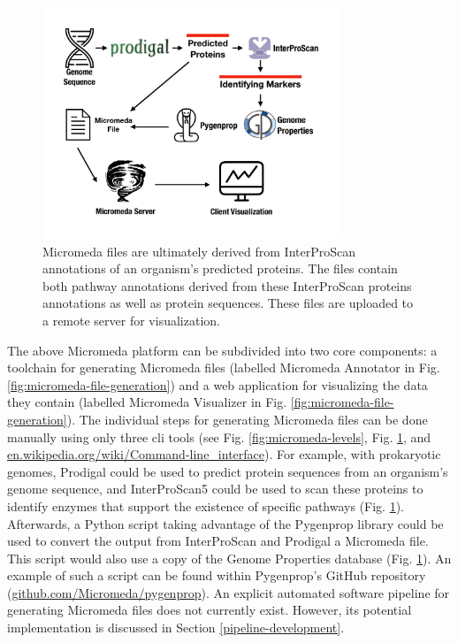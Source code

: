 \begin{figure}[!ht]
  \centering
	\includegraphics[width=0.8\textwidth]{media/how-micromeda-files-are-built.pdf}
	 \caption{Micromeda files are ultimately derived from InterProScan annotations of an organism's predicted proteins. The files contain both pathway annotations derived from these InterProScan proteins annotations as well as protein sequences. These files are uploaded to a remote server for visualization.}
	 \label{fig:micromeda-file-building-and-use}
\end{figure}

The above Micromeda platform can be subdivided into two core components: a toolchain for generating Micromeda files (labelled Micromeda Annotator in Fig. \ref{fig:micromeda-file-generation}) and a web application for visualizing the data they contain (labelled Micromeda Visualizer in Fig. \ref{fig:micromeda-file-generation}). The individual steps for generating Micromeda files can be done manually using only three \gls{cli} tools (see Fig. \ref{fig:micromeda-levels}, Fig. \ref{fig:micromeda-file-building-and-use}, and  \href{en.wikipedia.org/wiki/Command-line\_interface}{en.wikipedia.org/wiki/Command-line\_interface}). For example, with prokaryotic genomes, Prodigal could be used to predict protein sequences from an organism's genome sequence, and InterProScan5 could be used to scan these proteins to identify enzymes that support the existence of specific pathways (Fig. \ref{fig:micromeda-file-building-and-use}). Afterwards, a Python script taking advantage of the Pygenprop library could be used to convert the output from InterProScan and Prodigal a Micromeda file. This script would also use a copy of the Genome Properties database (Fig. \ref{fig:micromeda-file-building-and-use}). An example of such a script can be found within Pygenprop's GitHub repository (\href{github.com/Micromeda/pygenprop}{github.com/Micromeda/pygenprop}). An explicit automated software pipeline for generating Micromeda files does not currently exist. However, its potential implementation is discussed in Section \ref{pipeline-development}.

